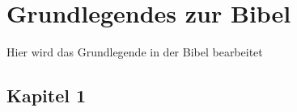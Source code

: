 \section{Grundlegendes zur Bibel}
Hier wird das Grundlegende in der Bibel bearbeitet
\subsection{Kapitel 1}
